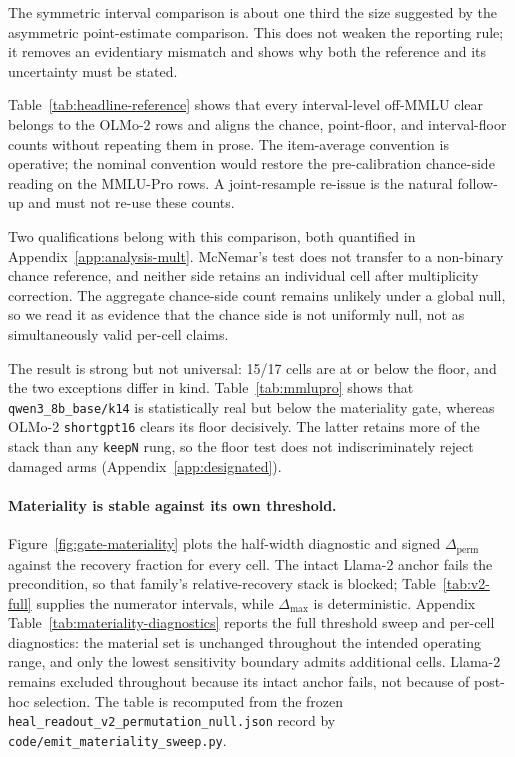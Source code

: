 The symmetric interval comparison is about one third the size suggested by the asymmetric point-estimate comparison. This does not weaken the reporting rule; it removes an evidentiary mismatch and shows why both the reference and its uncertainty must be stated.

Table~\ref{tab:headline-reference} shows that every interval-level off-MMLU clear belongs to the OLMo-2 rows and aligns the chance, point-floor, and interval-floor counts without repeating them in prose. The item-average convention is operative; the nominal convention would restore the pre-calibration chance-side reading on the MMLU-Pro rows. A joint-resample re-issue is the natural follow-up and must not re-use these counts.

Two qualifications belong with this comparison, both quantified in Appendix~\ref{app:analysis-mult}. McNemar's test does not transfer to a non-binary chance reference, and neither side retains an individual cell after multiplicity correction. The aggregate chance-side count remains unlikely under a global null, so we read it as evidence that the chance side is not uniformly null, not as simultaneously valid per-cell claims.

The result is strong but not universal: 15/17 cells are at or below the floor, and the two exceptions differ in kind. Table~\ref{tab:mmlupro} shows that \texttt{qwen3\_8b\_base/k14} is statistically real but below the materiality gate, whereas OLMo-2 \texttt{shortgpt16} clears its floor decisively. The latter retains more of the stack than any \texttt{keepN} rung, so the floor test does not indiscriminately reject damaged arms (Appendix~\ref{app:designated}).

\paragraph{Materiality is stable against its own threshold.} Figure~\ref{fig:gate-materiality} plots the half-width diagnostic and signed $\Delta_{\mathrm{perm}}$ against the recovery fraction for every cell. The intact Llama-2 anchor fails the precondition, so that family's relative-recovery stack is blocked; Table~\ref{tab:v2-full} supplies the numerator intervals, while $\Delta_{\max}$ is deterministic. Appendix Table~\ref{tab:materiality-diagnostics} reports the full threshold sweep and per-cell diagnostics: the material set is unchanged throughout the intended operating range, and only the lowest sensitivity boundary admits additional cells. Llama-2 remains excluded throughout because its intact anchor fails, not because of post-hoc selection. The table is recomputed from the frozen \texttt{heal\_readout\_v2\_permutation\_null.json} record by \texttt{code/emit\_materiality\_sweep.py}.


